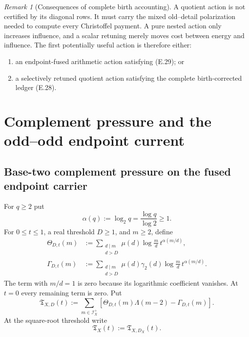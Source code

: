 \documentclass[11pt]{article}
\theoremstyle{definition}
\theoremstyle{remark}
\newtheorem{remark}[theorem]{Remark}
\begin{document}
\begin{remark}[Consequences of complete birth accounting]
A quotient action is not certified by its diagonal rows.  It must carry the
mixed old--detail polarization needed to compute every Christoffel payment.
A pure nested action only increases influence, and a scalar retuning merely
moves cost between energy and influence.  The first potentially useful action
is therefore either:
\begin{enumerate}[label=\textup{(\roman*)},leftmargin=2.8em]
\item an endpoint-fused arithmetic action satisfying \textup{(E.29)}; or
\item a selectively retuned quotient action satisfying the complete
      birth-corrected ledger \textup{(E.28)}.
\end{enumerate}
\end{remark}


\section{Complement pressure and the odd--odd endpoint current}
\label{sec:affine-pressure}

\subsection{Base-two complement pressure on the fused endpoint carrier}
\label{subsec:affpress-pressure-definition}

For $q\ge2$ put
\[
 \alpha(q):=\log_2q=\frac{\log q}{\log2}\ge1.
\]
For $0\le t\le1$, a real threshold $D\ge1$, and $m\ge2$, define
\begin{equation}
 \label{eq:affpress-pressure-writers}
 \boxed{
 \begin{aligned}
 \Theta_{D,t}(m)
 &:=\sum_{\substack{d\mid m\\d>D}}
     \mu(d)\log\frac md\,
     t^{\alpha(m/d)},\\
 \Gamma_{D,t}(m)
 &:=\sum_{\substack{d\mid m\\d>D}}
     \mu(d)\gamma_2(d)\log\frac md\,
     t^{\alpha(m/d)}.
 \end{aligned}}
 \tag{P.1}
\end{equation}
The term with $m/d=1$ is zero because its logarithmic coefficient vanishes.
At $t=0$ every remaining term is zero.  Put
\begin{equation}
 \label{eq:affpress-pressure-row}
 \boxed{
 \mathfrak T_{X,D}(t)
 :=\sum_{m\in\mathscr I_X^+}
 \left[
  \Theta_{D,t}(m)\Lambda(m-2)-\Gamma_{D,t}(m)
 \right].}
 \tag{P.2}
\end{equation}
At the square-root threshold write
\[
 \mathfrak T_X(t):=\mathfrak T_{X,D_X}(t).
\]
\end{document}
